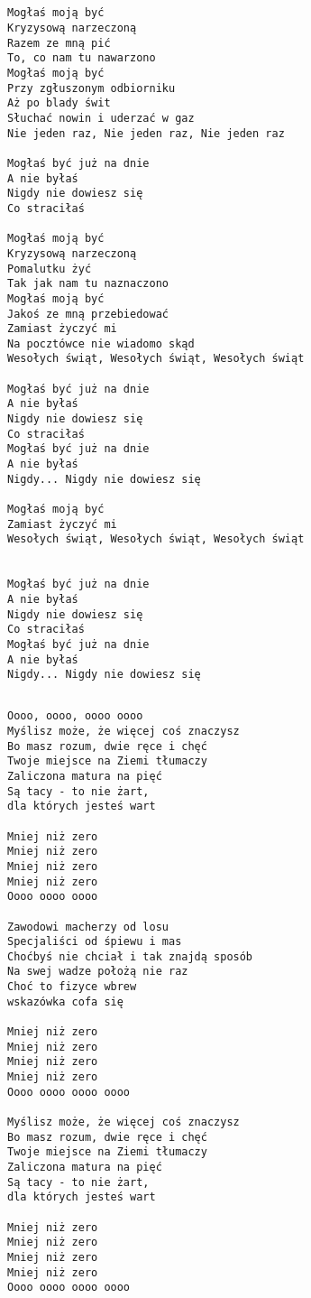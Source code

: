 \documentclass[12pt]{article}
\begin{document}
\subsection*{}
\begin{verbatim}
Mogłaś moją być
Kryzysową narzeczoną
Razem ze mną pić
To, co nam tu nawarzono
Mogłaś moją być
Przy zgłuszonym odbiorniku
Aż po blady świt
Słuchać nowin i uderzać w gaz
Nie jeden raz, Nie jeden raz, Nie jeden raz

Mogłaś być już na dnie
A nie byłaś
Nigdy nie dowiesz się
Co straciłaś

Mogłaś moją być
Kryzysową narzeczoną
Pomalutku żyć
Tak jak nam tu naznaczono
Mogłaś moją być
Jakoś ze mną przebiedować
Zamiast życzyć mi
Na pocztówce nie wiadomo skąd
Wesołych świąt, Wesołych świąt, Wesołych świąt

Mogłaś być już na dnie
A nie byłaś
Nigdy nie dowiesz się
Co straciłaś
Mogłaś być już na dnie
A nie byłaś
Nigdy... Nigdy nie dowiesz się

Mogłaś moją być
Zamiast życzyć mi
Wesołych świąt, Wesołych świąt, Wesołych świąt


Mogłaś być już na dnie
A nie byłaś
Nigdy nie dowiesz się
Co straciłaś
Mogłaś być już na dnie
A nie byłaś
Nigdy... Nigdy nie dowiesz się
\end{verbatim}
\clearpage

\subsection*{}
\begin{verbatim}
Oooo, oooo, oooo oooo
Myślisz może, że więcej coś znaczysz
Bo masz rozum, dwie ręce i chęć
Twoje miejsce na Ziemi tłumaczy
Zaliczona matura na pięć
Są tacy - to nie żart,
dla których jesteś wart

Mniej niż zero
Mniej niż zero
Mniej niż zero
Mniej niż zero
Oooo oooo oooo

Zawodowi macherzy od losu
Specjaliści od śpiewu i mas
Choćbyś nie chciał i tak znajdą sposób
Na swej wadze położą nie raz
Choć to fizyce wbrew
wskazówka cofa się

Mniej niż zero
Mniej niż zero
Mniej niż zero
Mniej niż zero
Oooo oooo oooo oooo

Myślisz może, że więcej coś znaczysz
Bo masz rozum, dwie ręce i chęć
Twoje miejsce na Ziemi tłumaczy
Zaliczona matura na pięć
Są tacy - to nie żart,
dla których jesteś wart

Mniej niż zero
Mniej niż zero
Mniej niż zero
Mniej niż zero
Oooo oooo oooo oooo
\end{verbatim}
\clearpage
\end{document}
